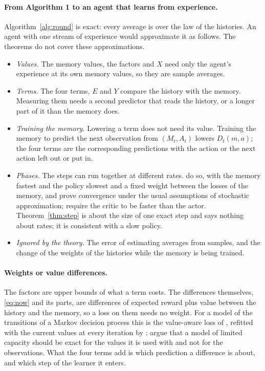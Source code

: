 \documentclass{article}
\theoremstyle{definition}
\begin{document}
\paragraph{From Algorithm 1 to an agent that learns from experience.} Algorithm~\ref{alg:round} is exact: every average is over the law of the histories. An agent with one stream of experience would approximate it as follows. The theorems do not cover these approximations.
\begin{itemize}
\item \emph{Values.} The memory values, the factors and $X$ need only the agent's experience at its own memory values, so they are sample averages.
\item \emph{Terms.} The four terms, $E$ and $Y$ compare the history with the memory. Measuring them needs a second predictor that reads the history, or a longer part of it than the memory does.
\item \emph{Training the memory.} Lowering a term does not need its value. Training the memory to predict the next observation from $(M_t,A_t)$ lowers $D_t(m,a)$; the four terms are the corresponding predictions with the action or the next action left out or put in.
\item \emph{Phases.} The steps can run together at different rates. \citet{subramanian2022approximate} do so, with the memory fastest and the policy slowest and a fixed weight between the losses of the memory, and prove convergence under the usual assumptions of stochastic approximation; \citet{konda2000actor} require the critic to be faster than the actor. Theorem~\ref{thm:step} is about the size of one exact step and says nothing about rates; it is consistent with a slow policy.
\item \emph{Ignored by the theory.} The error of estimating averages from samples, and the change of the weights of the histories while the memory is being trained.
\end{itemize}

\paragraph{Weights or value differences.} The factors are upper bounds of what a term costs. The differences themselves, \eqref{eq:now} and its parts, are differences of expected reward plus value between the history and the memory, so a loss on them needs no weight. For a model of the transitions of a Markov decision process this is the value-aware loss of \citet{farahmand2017vaml}, refitted with the current values at every iteration by \citet{farahmand2018itervaml}; \citet{grimm2020value} argue that a model of limited capacity should be exact for the values it is used with and not for the observations. What the four terms add is which prediction a difference is about, and which step of the learner it enters.
\end{document}
